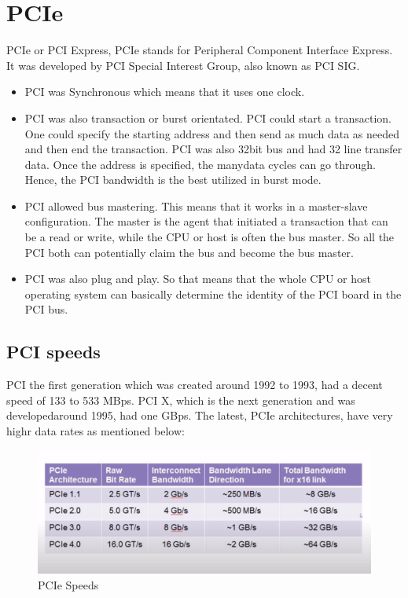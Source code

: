 \section{PCIe}
PCIe or PCI Express, PCIe stands for Peripheral Component Interface Express. It was developed by PCI Special Interest Group, also known as PCI SIG. 

\begin{itemize}
	\item PCI was Synchronous which means that it uses one clock. 
    \item PCI was also transaction or burst orientated. PCI could start a transaction. One could specify the starting address and then send as much data as needed and then end the transaction. PCI was also 32bit bus and had 32 line transfer data. Once the address is specified, the manydata cycles can go through. Hence, the PCI bandwidth is the best utilized in burst mode.
    \item PCI allowed bus mastering. This means that it works in a master-slave configuration. The master is the agent that initiated a transaction that can be a read or write, while the CPU or host is often the bus master. So all the PCI both can potentially claim the bus and become the bus master. 
    \item PCI was also plug and play. So that means that the whole CPU or host operating system can basically determine the identity of the PCI board in the PCI bus. 
\end{itemize}

\subsection{PCI speeds}

PCI the first generation which was created around 1992 to 1993, had a decent speed of 133 to 533 MBps. PCI X, which is the next generation and was developedaround 1995, had one GBps. The latest, PCIe architectures, have very highr data rates as mentioned below:

\begin{figure}[H]
	\begin{center}
		\includegraphics[width=5in]{images/PCIeSpeeds.png}
		\caption{PCIe Speeds}
		\label{PCIeSpeeds}
	\end{center}
\end{figure}


